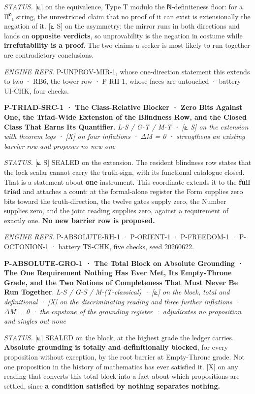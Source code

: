 \documentclass[10pt,twocolumn]{article}
\begin{document}
\emph{STATUS.} {[}⟀{]} on the equivalence, Type T modulo the
ℕ-definiteness floor: for a Π⁰₁ string, the unrestricted claim that no
proof of it can exist is extensionally the negation of it. {[}⟀ S{]} on
the asymmetry: the mirror runs in both directions and lands on
\textbf{opposite verdicts}, so unprovability is the negation in costume
while \textbf{irrefutability is a proof}. The two claims a seeker is
most likely to run together are contradictory conclusions.

\emph{ENGINE REFS.} P-UNPROV-MIR-1, whose one-direction statement this
extends to two · RB6, the tower row · P-RH-1, whose faces are untouched
· battery UI-CHK, four checks.

\textbf{P-TRIAD-SRC-1 · The Class-Relative Blocker · Zero Bits Against
One, the Triad-Wide Extension of the Blindness Row, and the Closed Class
That Earns Its Quantifier}. \emph{L-S / G-T / M-T · {[}⟀ S{]} on the
extension with theorem legs · {[}X{]} on four inflations · ΔM = 0 ·
strengthens an existing barrier row and proposes no new one}

\emph{STATUS.} {[}⟀ S{]} SEALED on the extension. The resident blindness
row states that the lock scalar cannot carry the truth-sign, with its
functional catalogue closed. That is a statement about \textbf{one}
instrument. This coordinate extends it to the \textbf{full triad} and
attaches a count: at the formal-alone register the Form supplies zero
bits toward the truth-direction, the twelve gates supply zero, the
Number supplies zero, and the joint reading supplies zero, against a
requirement of exactly one. \textbf{No new barrier row is proposed.}

\emph{ENGINE REFS.} P-ABSOLUTE-RH-1 · P-ORIENT-1 · P-FREEDOM-1 ·
P-OCTONION-1 · battery TS-CHK, five checks, seed 20260622.

\textbf{P-ABSOLUTE-GRO-1 · The Total Block on Absolute Grounding · The
One Requirement Nothing Has Ever Met, Its Empty-Throne Grade, and the
Two Notions of Completeness That Must Never Be Run Together}. \emph{L-S
/ G-S / M-(T-classical) · {[}⟀{]} on the block, total and definitional ·
{[}X{]} on the discriminating reading and three further inflations · ΔM
= 0 · the capstone of the grounding register · adjudicates no
proposition and singles out none}

\emph{STATUS.} {[}⟀{]} SEALED on the block, at the highest grade the
ledger carries. \textbf{Absolute grounding is totally and definitionally
blocked}, for every proposition without exception, by the root barrier
at Empty-Throne grade. Not one proposition in the history of mathematics
has ever satisfied it. {[}X{]} on any reading that converts this total
block into a fact about which propositions are settled, since \textbf{a
condition satisfied by nothing separates nothing.}
\end{document}
